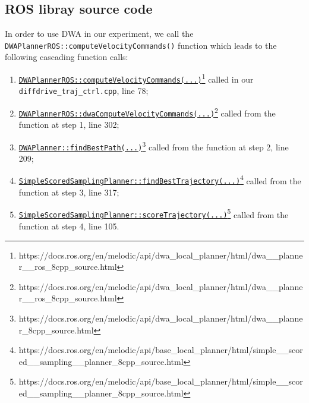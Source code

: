 \documentclass[11pt,a4paper]{article}
\begin{document}
\subsection{ROS libray source code}

In order to use DWA in our experiment, we call the \texttt{DWAPlannerROS::computeVelocityCommands()} function which leads to the following cascading function calls:\\
\begin{enumerate}

 \item \href{https://docs.ros.org/en/melodic/api/dwa_local_planner/html/dwa\_\_planner\_\_ros\_8cpp\_source.html}{\texttt{DWAPlannerROS::computeVelocityCommands(...)}}\footnote{https://docs.ros.org/en/melodic/api/dwa\_local\_planner/html/dwa\_\_planner\_\_ros\_8cpp\_source.html}
 called in our \texttt{diffdrive\_traj\_ctrl.cpp}, line 78;

 \item \href{https://docs.ros.org/en/melodic/api/dwa\_local\_planner/html/dwa\_\_planner\_\_ros\_8cpp\_source.html}{\texttt{DWAPlannerROS::dwaComputeVelocityCommands(...)}}\footnote{https://docs.ros.org/en/melodic/api/dwa\_local\_planner/html/dwa\_\_planner\_\_ros\_8cpp\_source.html}
 called from the function at step 1, line 302;

 \item \href{https://docs.ros.org/en/melodic/api/dwa\_local\_planner/html/dwa\_\_planner\_8cpp\_source.html}{\texttt{DWAPlanner::findBestPath(...)}}\footnote{https://docs.ros.org/en/melodic/api/dwa\_local\_planner/html/dwa\_\_planner\_8cpp\_source.html}
 called from the function at step 2, line 209;

 \item \href{https://docs.ros.org/en/melodic/api/base\_local\_planner/html/simple\_\_scored\_\_sampling\_\_planner\_8cpp\_source.html}{\texttt{SimpleScoredSamplingPlanner::findBestTrajectory(...)}}\footnote{https://docs.ros.org/en/melodic/api/base\_local\_planner/html/simple\_\_scored\_\_sampling\_\_planner\_8cpp\_source.html}
 called from the function at step 3, line 317;

 \item \href{https://docs.ros.org/en/melodic/api/base\_local\_planner/html/simple\_\_scored\_\_sampling\_\_planner\_8cpp\_source.html}{\texttt{SimpleScoredSamplingPlanner::scoreTrajectory(...)}}\footnote{https://docs.ros.org/en/melodic/api/base\_local\_planner/html/simple\_\_scored\_\_sampling\_\_planner\_8cpp\_source.html}
 called from the function at step 4, line 105.\\

\end{enumerate}
\end{document}
